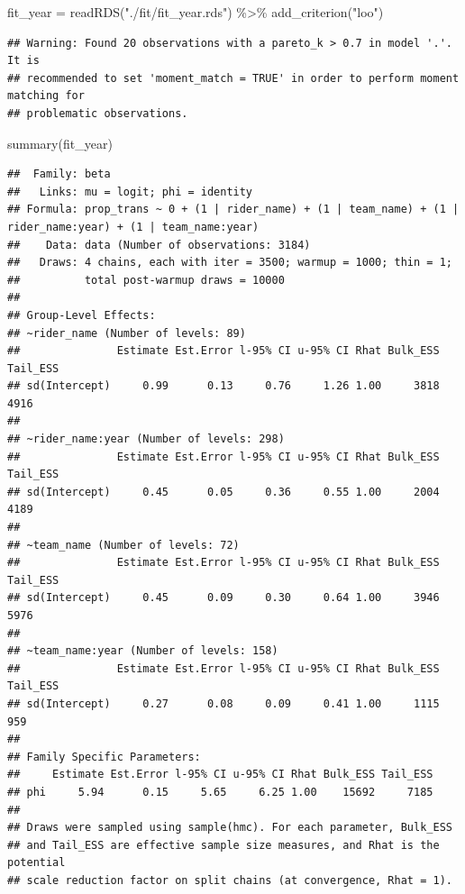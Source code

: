 \documentclass[
]{article}
\newenvironment{Shaded}{\begin{snugshade}}{\end{snugshade}}
\newcommand{\FunctionTok}[1]{\textcolor[rgb]{0.00,0.00,0.00}{#1}}
\newcommand{\NormalTok}[1]{#1}
\newcommand{\OtherTok}[1]{\textcolor[rgb]{0.56,0.35,0.01}{#1}}
\newcommand{\SpecialCharTok}[1]{\textcolor[rgb]{0.00,0.00,0.00}{#1}}
\newcommand{\StringTok}[1]{\textcolor[rgb]{0.31,0.60,0.02}{#1}}
\begin{document}
\begin{Shaded}
\begin{Highlighting}[]
\NormalTok{fit\_year }\OtherTok{=} \FunctionTok{readRDS}\NormalTok{(}\StringTok{"./fit/fit\_year.rds"}\NormalTok{) }\SpecialCharTok{\%\textgreater{}\%} \FunctionTok{add\_criterion}\NormalTok{(}\StringTok{"loo"}\NormalTok{)}
\end{Highlighting}
\end{Shaded}

\begin{verbatim}
## Warning: Found 20 observations with a pareto_k > 0.7 in model '.'. It is
## recommended to set 'moment_match = TRUE' in order to perform moment matching for
## problematic observations.
\end{verbatim}

\begin{Shaded}
\begin{Highlighting}[]
\FunctionTok{summary}\NormalTok{(fit\_year)}
\end{Highlighting}
\end{Shaded}

\begin{verbatim}
##  Family: beta 
##   Links: mu = logit; phi = identity 
## Formula: prop_trans ~ 0 + (1 | rider_name) + (1 | team_name) + (1 | rider_name:year) + (1 | team_name:year) 
##    Data: data (Number of observations: 3184) 
##   Draws: 4 chains, each with iter = 3500; warmup = 1000; thin = 1;
##          total post-warmup draws = 10000
## 
## Group-Level Effects: 
## ~rider_name (Number of levels: 89) 
##               Estimate Est.Error l-95% CI u-95% CI Rhat Bulk_ESS Tail_ESS
## sd(Intercept)     0.99      0.13     0.76     1.26 1.00     3818     4916
## 
## ~rider_name:year (Number of levels: 298) 
##               Estimate Est.Error l-95% CI u-95% CI Rhat Bulk_ESS Tail_ESS
## sd(Intercept)     0.45      0.05     0.36     0.55 1.00     2004     4189
## 
## ~team_name (Number of levels: 72) 
##               Estimate Est.Error l-95% CI u-95% CI Rhat Bulk_ESS Tail_ESS
## sd(Intercept)     0.45      0.09     0.30     0.64 1.00     3946     5976
## 
## ~team_name:year (Number of levels: 158) 
##               Estimate Est.Error l-95% CI u-95% CI Rhat Bulk_ESS Tail_ESS
## sd(Intercept)     0.27      0.08     0.09     0.41 1.00     1115      959
## 
## Family Specific Parameters: 
##     Estimate Est.Error l-95% CI u-95% CI Rhat Bulk_ESS Tail_ESS
## phi     5.94      0.15     5.65     6.25 1.00    15692     7185
## 
## Draws were sampled using sample(hmc). For each parameter, Bulk_ESS
## and Tail_ESS are effective sample size measures, and Rhat is the potential
## scale reduction factor on split chains (at convergence, Rhat = 1).
\end{verbatim}
\end{document}
